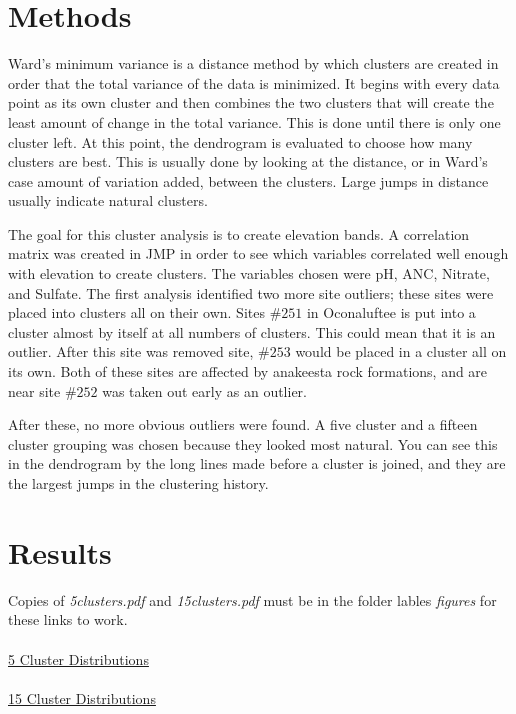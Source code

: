 \documentclass[11pt]{article} %
\begin{document}
\section{Methods}
Ward’s minimum variance is a distance method by which clusters are created in order that the total variance of the data is minimized.  It begins with every data point as its own cluster and then combines the two clusters that will create the least amount of change in the total variance.  This is done until there is only one cluster left.  At this point, the dendrogram is evaluated to choose how many clusters are best.  This is usually done by looking at the distance, or in Ward’s case amount of variation added, between the clusters.  Large jumps in distance usually indicate natural clusters.

The goal for this cluster analysis is to create elevation bands.  A correlation matrix was created in JMP in order to see which variables correlated well enough with elevation to create clusters.  The variables chosen were pH, ANC, Nitrate, and Sulfate.   The first analysis identified two more site outliers; these sites were placed into clusters all on their own.  Sites $\#251$ in Oconaluftee is put into a cluster almost by itself at all numbers of clusters.  This could mean that it is an outlier.  After this site was removed site, $\#253$ would be placed in a cluster all on its own.  Both of these sites are affected by anakeesta rock formations, and are near site $\#252$ was taken out early as an outlier.

After these, no more obvious outliers were found.  A five cluster and a fifteen cluster grouping was chosen because they looked most natural.  You can see this in the dendrogram by the long lines made before a cluster is joined, and they are the largest jumps in the clustering history.

\section{Results}%
Copies of  {\it 5clusters.pdf} and {\it 15clusters.pdf} must be in the folder lables {\it figures} for these links to work.\\
\\
\href{run:figures/5clusters.pdf}{5 Cluster Distributions}\\
\\ 
\href{run:figures/15clusters.pdf}{15 Cluster Distributions}\\
\end{document}
